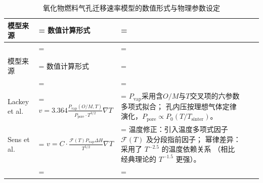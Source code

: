 \begin{xltabular}{\textwidth}{@{}
		>{\centering\arraybackslash}m{2.4cm}
		>{\hsize\linewidth=\hsize
			\centering\arraybackslash}X
		>{\hsize\linewidth=\hsize
			\RaggedRight\arraybackslash}X
		@{}}
	
	\caption{氧化物燃料气孔迁移速率模型的数值形式与物理参数设定}
	\label{tab:pore_migration_formulations} \\
	
	\toprule
	模型来源
	&
	数值计算形式
	&
	\\
	\midrule
	\endfirsthead
	
	\\
	
	\toprule
	模型来源
	&
	数值计算形式
	&
	\\
	\midrule
	\endhead
	
	\midrule
	\\
	\endfoot
	
	\bottomrule
	\endlastfoot
	
	
	Lackey et al. \cite{lackeyPorosityActinideRedistribution1972} &
	$\displaystyle v = 3.364 \frac{P_{\mathrm{vap}}(O/M, T)}
	{P_{\mathrm{pore}} \cdot T^{3/2}} \nabla T$ &
	$P_{\mathrm{vap}}$采用含$O/M$与$T$交叉项的六参数多项式拟合；\newline
	孔内压按理想气体定律演化，$P_{\mathrm{pore}}\propto P_0(T/T_{\mathrm{sinter}})$。
	\\
	\addlinespace
	
	Sens et al. \cite{sensKineticsPoreMovement1972} &
	$\displaystyle v = C \cdot
	\frac{\mathcal{F}(T) P_{\mathrm{vap}} \Delta H}{T^{5/2}} \nabla T$ &
	温度修正：引入温度多项式因子 $\mathcal{F}(T)$ 及分段指前因子；\newline
	幂律差异：采用了 $T^{-2.5}$ 的温度依赖关系
	（相比经典理论的 $T^{-1.5}$ 更强）。
	\\
	\addlinespace
	

\end{xltabular}
